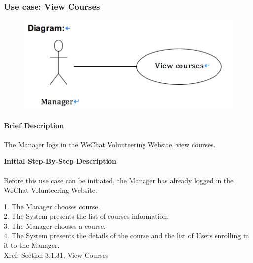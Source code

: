\documentclass[12pt]{report}
\begin{document}
\newpage
\subsubsection{Use case:  View Courses }

\begin{figure}[!htb]
  \includegraphics{217.PNG}
\end{figure}
\paragraph{}
\begin{flushleft}
\textbf{Brief Description }
\paragraph{}
The Manager logs in the WeChat Volunteering Website, view courses.\\

\begin{flushleft}
\textbf{Initial Step-By-Step Description }
\paragraph{}
Before this use case can be initiated, the Manager has already logged in the WeChat Volunteering Website.

\begin{flushleft}
1.	The Manager chooses course. \\
2.	The System presents the list of courses information. \\
3.	The Manager chooses a course. \\
4.	The System presents the details of the course and the list of Users enrolling in it to the Manager. \\
Xref: Section 3.1.31, View Courses
\end{flushleft}
\end{flushleft}
\end{flushleft}
\end{document}

